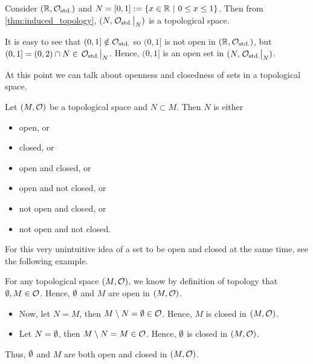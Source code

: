 \begin{example}
	Consider \((\mathbb R, \mathcal{O}_{\text{std.}})\) and \(N = \qty[0, 1] := \qty{x \in \mathbb R\ \middle|\ 0 \le x \le 1}\). Then from \cref{thm:induced_topology}, \((N, \eval{\Ostd}_N)\) is a topological space.

	It is easy to see that \((0, 1] \notin \mathcal{O}_{\text{std.}}\) so \((0, 1]\) is not open in \((\mathbb R, \mathcal{O}_{\text{std.}})\), but \((0, 1] = (0, 2) \cap N \in \eval{\Ostd}_N\). Hence, \((0, 1]\) is an open set in \((N, \eval{\Ostd}_N)\).
\end{example}
At this point we can talk about openness and closedness of sets in a topological space.
\begin{remark}
	Let \((M, \mathcal{O})\) be a topological space and \(N \subset M\). Then \(N\) is either
	\begin{itemize}[noitemsep]
		\item open, or
		\item closed, or
		\item open and closed, or
		\item open and not closed, or
		\item not open and closed, or
		\item not open and not closed.
	\end{itemize}
\end{remark}
For this very unintuitive idea of a set to be open and closed at the same time, see the following example.
\begin{example}
	For any topological space \((M, \mathcal{O})\), we know by definition of topology that \(\emptyset, M \in \mathcal{O}\). Hence, \(\emptyset\) and \(M\) are open in \((M, \mathcal{O})\).
	\begin{itemize}
		\item Now, let \(N = M\), then \(M \setminus N = \emptyset \in \mathcal{O}\). Hence, \(M\) is closed in \((M, \mathcal{O})\).
		\item Let \(N = \emptyset\), then \(M \setminus N = M \in \mathcal{O}\). Hence, \(\emptyset\) is closed in \((M, \mathcal{O})\).
	\end{itemize}
	Thus, \(\emptyset\) and \(M\) are both open and closed in \((M, \mathcal{O})\).
\end{example}

